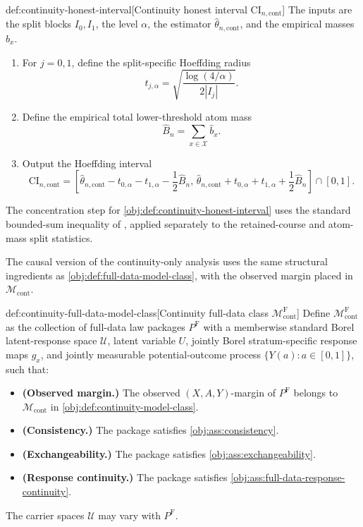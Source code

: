 \documentclass[11pt]{article}
\begin{document}
\begin{algorithmv}{def:continuity-honest-interval}[Continuity honest interval \(\mathrm{CI}_{n,\mathrm{cont}}\)]
The inputs are the split blocks \(I_0,I_1\), the level \(\alpha\), the estimator \(\widehat\theta_{n,\mathrm{cont}}\), and the empirical masses \(\widehat b_x\).
\begin{enumerate}
\item For \(j=0,1\), define the split-specific Hoeffding radius
\[
t_{j,\alpha}
=
\sqrt{\frac{\log(4/\alpha)}{2|I_j|}}.
\]
\item Define the empirical total lower-threshold atom mass
\[
\widehat B_n
=
\sum_{x\in\mathcal X}\widehat b_x.
\]
\item Output the Hoeffding interval
\[
\mathrm{CI}_{n,\mathrm{cont}}
=
\left[
\widehat\theta_{n,\mathrm{cont}}-t_{0,\alpha}-t_{1,\alpha}-\frac12\widehat B_n,\,
\widehat\theta_{n,\mathrm{cont}}+t_{0,\alpha}+t_{1,\alpha}+\frac12\widehat B_n
\right]\cap[0,1].
\]
\end{enumerate}
\end{algorithmv}

The concentration step for \cref{obj:def:continuity-honest-interval} uses the standard bounded-sum inequality of \citet[Theorem~2]{Hoeffding1963}, applied separately to the retained-course and atom-mass split statistics.

The causal version of the continuity-only analysis uses the same structural ingredients as \cref{obj:def:full-data-model-class}, with the observed margin placed in \(\mathcal M_{\mathrm{cont}}\).

\begin{definitionv}{def:continuity-full-data-model-class}[Continuity full-data class \(\mathcal M_{\mathrm{cont}}^{\mathrm F}\)]
Define \(\mathcal M_{\mathrm{cont}}^{\mathrm F}\) as the collection of full-data law packages \(P^{\mathrm F}\) with a memberwise standard Borel latent-response space \(\mathcal U\), latent variable \(U\), jointly Borel stratum-specific response maps \(g_x\), and jointly measurable potential-outcome process \(\{Y(a):a\in[0,1]\}\), such that:
\begin{itemize}
\item \textbf{(Observed margin.)} The observed \((X,A,Y)\)-margin of \(P^{\mathrm F}\) belongs to \(\mathcal M_{\mathrm{cont}}\) in \cref{obj:def:continuity-model-class}.
\item \textbf{(Consistency.)} The package satisfies \cref{obj:ass:consistency}.
\item \textbf{(Exchangeability.)} The package satisfies \cref{obj:ass:exchangeability}.
\item \textbf{(Response continuity.)} The package satisfies \cref{obj:ass:full-data-response-continuity}.
\end{itemize}
The carrier spaces \(\mathcal U\) may vary with \(P^{\mathrm F}\).
\end{definitionv}
\end{document}
